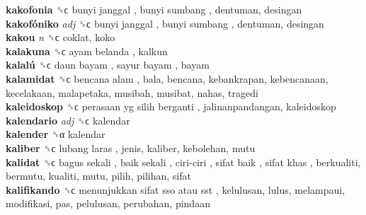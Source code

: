 \textbf{kakofonia} ␝ϲ   bunyi janggal ,  bunyi sumbang , dentuman, desingan  \\
\textbf{kakofóniko} \emph{adj}  ␝ϲ   bunyi janggal ,  bunyi sumbang , dentuman, desingan  \\
\textbf{kakou} \emph{n}  ␝ϲ  coklat, koko  \\
\textbf{kalakuna} ␝ϲ   ayam belanda , kalkun  \\
\textbf{kalalú} ␝ϲ   daun bayam ,  sayur bayam , bayam  \\
\textbf{kalamidat} ␝ϲ   bencana alam , bala, bencana, kebankrapan, kebencanaan, kecelakaan, malapetaka, musibah, musibat, nahas, tragedi  \\
\textbf{kaleidoskop} ␝ϲ   perasaan yg silih berganti , jalinanpandangan, kaleidoskop  \\
\textbf{kalendario} \emph{adj}  ␝ϲ  kalendar  \\
\textbf{kalender} ␝α  kalendar  \\
\textbf{kaliber} ␝ϲ   lubang laras , jenis, kaliber, kebolehan, mutu  \\
\textbf{kalidat} ␝ϲ   bagus sekali ,  baik sekali ,  ciri-ciri ,  sifat baik ,  sifat khas , berkualiti, bermutu, kualiti, mutu, pilih, pilihan, sifat  \\
\textbf{kalifikando} ␝ϲ   menunjukkan sifat sso atau sst , kelulusan, lulus, melampaui, modifikasi, pas, pelulusan, perubahan, pindaan  \\
